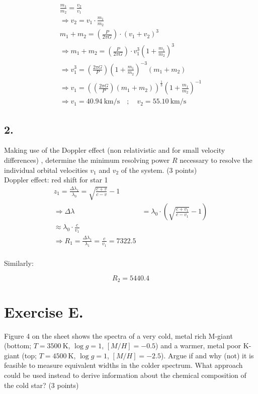 \documentclass[11pt,a4paper,twoside]{article}
\begin{document}
\begin{eqnarray}
\frac{m_1}{m_2} =\frac{v_2}{v_1}\\
\Rightarrow v_2 = v_1\cdot \frac{m_1}{m_2}\\
m_1 + m_2 = \left(\frac{P}{2\pi G}\right)\cdot(v_1 + v_2)^3\\
\Rightarrow m_1 + m_2 = \left(\frac{P}{2\pi G}\right)\cdot v_1^3 \left(1 +  \frac{m_1}{m_2}\right)^3\\
\Rightarrow v_1^3 =\left(\frac{2\pi G}{P}\right) \left(1+\frac{m_1}{m_2}\right)^{-3}\left(m_1+m_2\right)\\
\Rightarrow v_1 = \left(\left(\frac{2\pi G}{P}\right)\left(m_1+m_2\right)\right)^{\frac{1}{3}}\left(1+\frac{m_1}{m_2}\right)^{-1}\\
\Rightarrow v_1 =\SI{40.94}{\kilo\metre\per\second} \quad ; \quad v_2 =\SI{55.10}{\kilo\metre\per\second}
\end{eqnarray}

\subsection*{2.} Making use of the Doppler effect (non relativistic and for small velocity differences) ,
determine the minimum resolving power $R$ necessary to resolve the individual orbital
velocities $v_1$ and $v_2$ of the system. (3 points)\\

Doppler effect:
red shift for star 1
\begin{eqnarray}
z_1=\frac{\Delta\lambda_1}{\lambda_0} = \sqrt{\frac{c+v}{c-v}}-1 \\
\Rightarrow \Delta\lambda&=\lambda_0\cdot \left(\sqrt{\frac{c+v_1}{c-v_1}}-1\right)\\
\approx\lambda_0\cdot \frac{c}{v_1}\\
\Rightarrow R_1 = \frac{\Delta\lambda_1}{\lambda_1}=\frac{c}{v_1} = \num{7322.5}\\
\end{eqnarray}

Similarly: 

\begin{equation}
 R_2 = \num{5440.4}
\end{equation}

\section*{Exercise E.}

Figure 4 on the sheet shows the spectra of a very cold, metal rich M-giant 
(bottom; $T = \SI{3500}{\kelvin}$, $\log g = 1$, $[M/H] = \num{-0.5}$) and a warmer, metal poor K-giant 
(top; $T = \SI{4500}{\kelvin}$, $\log g = 1$, $[M/H] = \num{-2.5}$). Argue if and why (not) it is 
feasible to measure equivalent widths in the colder spectrum. What approach 
could be used instead to derive information about the chemical composition of 
the cold star? (3 points) \\
\end{document}
